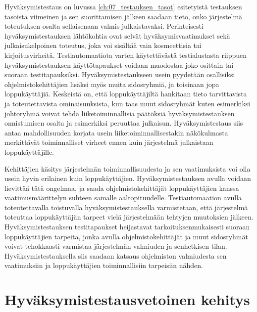   Hyväksymistestaus on luvussa \ref{ch:07_testauksen_tasot} esitetyistä testauksen tasoista viimeinen ja sen suorittamisen jälkeen saadaan tieto, onko järjestelmä toteutuksen osalta sellaisenaan valmis julkaistavaksi.
  Perinteisesti hyväksymistestauksen lähtökohtia ovat selvät hyväksymisvaatimukset sekä julkaisukelpoinen toteutus, joka voi sisältää vain kosmeettisia tai kirjoitusvirheitä.
  Testiautomaatiota varten käytettävästä testialustasta riippuen hyväksymistestauksen käyttötapaukset voidaan muodostaa joko osittain tai suoraan testitapauksiksi.
  Hyväksymistestaukseen usein pyydetään osallisiksi ohjelmistokehittäjien lisäksi myös muita sidosryhmiä, ja toisinaan jopa loppukäyttäjiä.
  Keskeistä on, että loppukäyttäjiltä hankitaan tieto tarvittavista ja toteutettavista ominaisuuksista, kun taas muut sidosryhmät kuten esimerkiksi johtoryhmä voivat tehdä liiketoiminnallisia päätöksiä hyväksymistestauksen onnistumisen osalta ja esimerkiksi peruuttaa julkaisun.
  Hyväksymistestaus siis antaa mahdollisuuden korjata usein liiketoiminnallisestakin näkökulmasta merkittävät toiminnalliset virheet ennen kuin järjestelmä julkaistaan loppukäyttäjille.

  Kehittäjien käsitys järjestelmän toiminnallisuudesta ja sen vaatimuksista voi olla usein hyvin erilainen kuin loppukäyttäjien.
  Hyväksymistestauksen avulla voidaan lievittää tätä ongelmaa, ja saada ohjelmistokehittäjät loppukäyttäjien kanssa vaatimusmäärittelyn suhteen samalle aaltopituudelle.
  Testiautomaation avulla toteutettavalla toistuvalla hyväksymistestauksella varmistetaan, että järjestelmä toteuttaa loppukäyttäjän tarpeet vielä järjestelmään tehtyjen muutoksien jälkeen.
  Hyväksymistestauksen testitapaukset heijastavat tarkoituksenmukaisesti suoraan loppukäyttäjien tarpeita, jonka avulla ohjelmistokehittäjät ja muut sidosryhmät voivat tehokkaasti varmistaa järjestelmän valmiuden ja senhetkisen tilan.
  Hyväksymistestauksella siis saadaan katsaus ohjelmiston valmiudesta sen vaatimuksiin ja loppukäyttäjien toiminnallisiin tarpeisiin nähden.

\section{Hyväksymistestausvetoinen kehitys} \label{ch:08_hyvaksymistestausvetoinen_kehitys}

